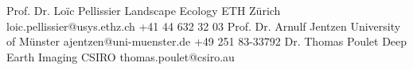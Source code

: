 %
%
%


\begin{referees}
		{Prof. Dr. Loïc Pellissier}
		{Landscape Ecology}
		{ETH Zürich}
		{loic.pellissier@usys.ethz.ch}
		{+41 44 632 32 03}
		{Prof. Dr. Arnulf Jentzen}
		{}
		{University of Münster}
		{ajentzen@uni-muenster.de}
		{+49 251 83-33792}
		{Dr. Thomas Poulet}
		{Deep Earth Imaging}
		{CSIRO}
		{thomas.poulet@csiro.au}
		{}
\end{referees}